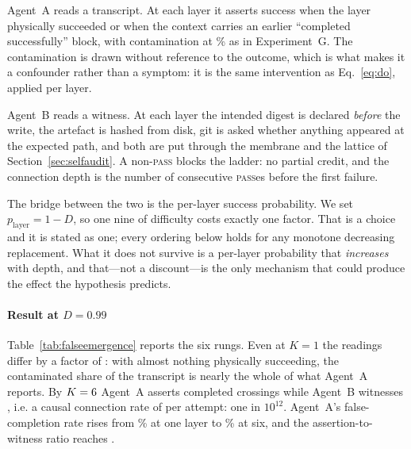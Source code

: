 \documentclass[conference]{IEEEtran}
\theoremstyle{definition}
\begin{document}
Agent~A reads a transcript. At each layer it asserts success when the layer
physically succeeded or when the context carries an earlier ``completed
successfully'' block, with contamination at \teContamPct\% as in Experiment~G. The
contamination is drawn without reference to the outcome, which is what makes it a
confounder rather than a symptom: it is the same intervention as
Eq.~\eqref{eq:do}, applied per layer.

Agent~B reads a witness. At each layer the intended digest is declared
\emph{before} the write, the artefact is hashed from disk, git is asked whether
anything appeared at the expected path, and both are put through the membrane and
the lattice of Section~\ref{sec:selfaudit}. A non-\textsc{pass} blocks the ladder:
no partial credit, and the connection depth is the number of consecutive
\textsc{pass}es before the first failure.

The bridge between the two is the per-layer success probability. We set
$p_{\text{layer}}=1-D$, so one nine of difficulty costs exactly one factor. That is
a choice and it is stated as one; every ordering below holds for any monotone
decreasing replacement. What it does not survive is a per-layer probability that
\emph{increases} with depth, and that---not a discount---is the only mechanism that
could produce the effect the hypothesis predicts.

\paragraph{Result at $D=0.99$} Table~\ref{tab:falseemergence} reports the six
rungs. Even at $K=1$ the readings differ by a factor of \teGapDepthOne: with almost
nothing physically succeeding, the contaminated share of the transcript is nearly
the whole of what Agent~A reports. By $K=6$ Agent~A asserts
\teANinetyNine{} completed crossings while Agent~B witnesses
\teBCrossNinetyNine{}, i.e. a causal connection rate of \teBRateNinetyNine{} per
attempt: one in $10^{12}$. Agent~A's false-completion rate rises from
\teAFcrDepthOne\% at one layer to \teAFcrNinetyNine\% at six, and the
assertion-to-witness ratio reaches \teInflationDeep.

\begin{table}[t]
\centering
\caption{Experiment H. One difficulty, six depths. ``A asserted'' counts crossings
Agent~A reports complete; ``A FCR'' is the share of those that are not there;
``B witnessed'' recomputes each layer's digest and blocks on the first non-PASS.
``B nested'' applies the budget of \eqref{eq:depth} at its most generous admissible
value, $10^{-(n+\log_{10}K)}$. At $D=0.99$ ($n=\teNinesNinetyNine$), anchor
\teAnchor{} attempts.}
\label{tab:falseemergence}
\footnotesize

\end{table}
\end{document}
